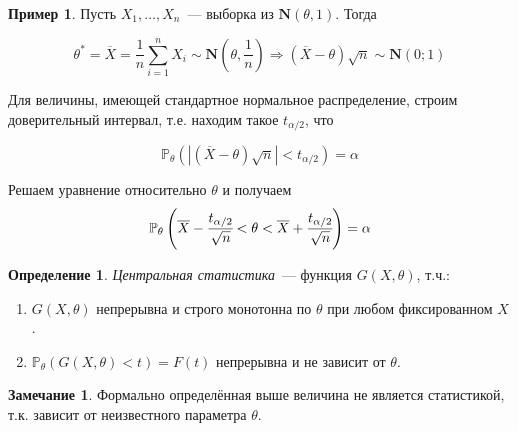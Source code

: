 \documentclass[oneside,final,14pt]{extreport}
\theoremstyle{plain}
\theoremstyle{definition}
\newtheorem*{defn}{Определение}
\newtheorem*{exmp}{Пример}
\newtheorem*{rmrk}{Замечание}
\theoremstyle{named}
\begin{document}
\begin{exmp}
Пусть $X_1, \ldots, X_n$~--- выборка из $\mathbf{N}(\theta, 1)$. Тогда

\begin{equation*}
    \theta^{*}
    = \overline{X}
    = \frac{1}{n} \sum\limits_{i=1}^{n} X_{i} \sim \mathbf{N}\left(\theta, \frac{1}{n}\right)
    \Rightarrow (\overline{X}-\theta) \sqrt{n} \sim \mathbf{N}(0;1)
\end{equation*}

Для величины, имеющей стандартное нормальное распределение, строим доверительный интервал, т.е. находим такое $t_{\alpha / 2}$, что 

\begin{equation*}
    \mathbb{P}_{\theta}\left(|(\overline{X}-\theta) \sqrt{n}|<t_{\alpha / 2}\right)=\alpha
\end{equation*}

Решаем уравнение относительно $\theta$ и получаем
\begin{equation*}
    \mathbb{P}_{\theta}\left(\overline{X}-\cfrac{t_{\alpha / 2}}{\sqrt{n}}<\theta<\overline{X}+\cfrac{t_{\alpha / 2}}{\sqrt{n}}\right)=\alpha 
\end{equation*}

\end{exmp}

\begin{defn}
{\it Центральная статистика}~--- функция $G(X,\theta)$, т.ч.:
\begin{enumerate}
    \item $G(X,\theta)$ непрерывна и строго монотонна по $\theta$ при любом фиксированном $X$.
    \item $\mathbb{P}_{\theta}(G(X, \theta)<t)=F(t)$ непрерывна и не зависит от $\theta$.
\end{enumerate}
\end{defn}

\begin{rmrk}
Формально определённая выше величина не является статистикой, т.к. зависит от неизвестного параметра $\theta$.
\end{rmrk}
\end{document}
